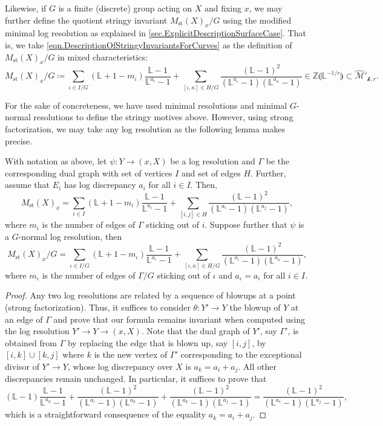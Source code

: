 \documentclass[12pt]{amsart}
\theoremstyle{plain}   %
\theoremstyle{definition}    %
\theoremstyle{remark}    %
\numberwithin{equation}{theorem}
\DeclareMathOperator{\st}{\mathrm{st}}
\newcommand{\kay}{\mathcal{k}}
\newcommand{\sM}{\mathcal{M}}
\newcommand{\bL}{\mathbb{L}}
\newcommand{\bZ}{\mathbb{Z}}
\begin{document}
Likewise, if $G$ is a finite (discrete) group acting on $X$ and fixing $x$, we may further define the quotient stringy invariant $M_{\st}(X)_x/G$ using the modified minimal log resolution as explained in \autoref{sec.ExplicitDescriptionSurfaceCase}. That is, we take \autoref{eqn.DescriptionOfStringyInvariantsForCurves} as the definition of $M_{\st}(X)_x/G$ in mixed characteristics:
\[
M_{\st}(X)_x/G \coloneqq \sum_{\iota\in I/G} (\bL +1 - m_{\iota}) \frac{\bL-1}{\bL^{a_{\iota}}-1}+\sum_{[\iota,\kappa]\in H/G}\frac{(\bL-1)^{2}}{(\bL^{a_{\iota}}-1)(\bL^{a_{\kappa}}-1)} \in \bZ\llparenthesis\bL^{-1/r} \rrparenthesis \subset \hat{\sM}'_{\kay,r}.
\]


For the sake of concreteness, we have used minimal resolutions and minimal $G$-normal resolutions to define the stringy motives above. However, using strong factorization, we may take any log resolution as the following lemma makes precise.
\begin{lemma}\label{lemma.StringyMotivesAreWellDefined}
With notation as above, let $\psi \colon Y \to (x,X)$ be a log resolution and $\Gamma$ be the corresponding dual graph with set of vertices $I$ and set of edges $H$. Further, assume that $E_i$ has log discrepancy $a_i$ for all $i \in I$. Then,
\[
M_{\st}(X)_x=\sum_{i\in I} (\bL +1 - m_i) \frac{\bL-1}{\bL^{a_{i}}-1}+\sum_{[i,j]\in H}\frac{(\bL-1)^{2}}{(\bL^{a_i}-1)(\bL^{a_j}-1)},
\]
where $m_i$ is the number of edges of $\Gamma$ sticking out of $i$. Suppose further that $\psi$ is a $G$-normal log resolution, then
\[
M_{\st}(X)_x/G=\sum_{\iota\in I/G} (\bL +1 - m_{\iota}) \frac{\bL-1}{\bL^{a_{\iota}}-1}+\sum_{[\iota,\kappa]\in H/G}\frac{(\bL-1)^{2}}{(\bL^{a_{\iota}}-1)(\bL^{a_{\kappa}}-1)},
\]
where $m_{\iota}$ is the number of edges of $\Gamma/G$ sticking out of $\iota$ and $a_{\iota} = a_i$ for all $i \in I$.
\end{lemma}
\begin{proof}
Any two log resolutions are related by a sequence of blowups at a point (strong factorization). Thus, it suffices to consider $\theta \colon Y' \to Y$ the blowup of $Y$ at an edge of $\Gamma$ and prove that our formula remains invariant when computed using the log resolution $Y' \to Y \to (x,X)$. Note that the dual graph of $Y'$, say $\Gamma'$, is obtained from $\Gamma$ by replacing the edge that is blown up, say $[i,j]$, by $[i,k]\cup [k,j]$ where $k$ is the new vertex of $\Gamma'$ corresponding to the exceptional divisor of $Y' \to Y$, whose log discrepancy over $X$ is $a_k=a_i+a_j$. All other discrepancies remain unchanged. In particular, it suffices to prove that
\[
(\bL-1) \frac{\bL-1}{\bL^{a_k}-1} + \frac{(\bL-1)^2}{(\bL^{a_i}-1)(\bL^{a_k}-1)}+\frac{(\bL-1)^2}{(\bL^{a_k}-1)(\bL^{a_j}-1)} = \frac{(\bL-1)^2}{(\bL^{a_i}-1)(\bL^{a_j}-1)},
\]
which is a straightforward consequence of the equality $a_k=a_i+a_j$.
\end{proof}
\end{document}
